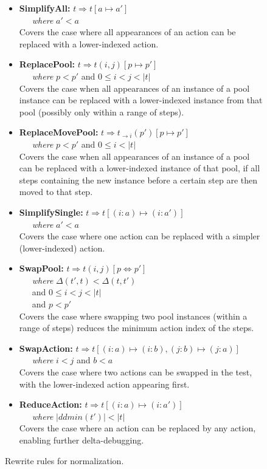 \begin{figure}[t]
{\scriptsize
\begin{itemize}
\item {\bf SimplifyAll:}
$t \Rightarrow t[a \mapsto a']$\\
\-\ \ \ \emph{where} $a' < a$\\
Covers the case where all appearances of an action can be replaced with a 
lower-indexed action. 
\item {\bf ReplacePool:}
$t \Rightarrow t(i,j)[p \mapsto p']$\\ 
\-\ \ \ \emph{where} $p < p'$ and $0 \leq i < j <
|t|$\\
Covers the case when all appearances of an instance of a pool instance
can be replaced with 
a lower-indexed instance from that pool (possibly only within a range of steps).
\item {\bf ReplaceMovePool:}
$t \Rightarrow t_{\rightarrow i}(p')[p \mapsto p']$\\
\-\ \ \ \emph{where} $p < p'$ and $0
\leq i < |t|$\\
Covers the case when all appearances of an instance of a pool can be replaced with
a lower-indexed instance of that pool, if all steps containing the new instance before a
certain step are then moved to that step.
\item {\bf SimplifySingle:}
$t \Rightarrow t[(i: a) \mapsto (i: a')]$\\
\-\ \ \ \emph{where} $a' < a$\\
Covers the case where one action can be replaced with a 
simpler (lower-indexed) action. 
\item {\bf SwapPool:}
$t \Rightarrow t(i,j)[p \Leftrightarrow p']$\\
\-\ \ \ \emph{where} $\Delta(t',t) < \Delta(t,t')$\\
\-\ \ \ and $0 \leq i < j < |t|$\\
\-\ \ \ and $p < p'$\\
Covers the case where swapping two pool instances (within a range of steps) reduces
the minimum action index of the steps.
\item {\bf SwapAction:}
$t \Rightarrow t[(i: a) \mapsto (i: b), (j: b) \mapsto (j: a)]$\\
\-\ \ \ \emph{where} $i < j$ and
$b < a$\\
Covers the case where two actions can be swapped in the test, with the
lower-indexed action appearing first.
\item {\bf ReduceAction:}
$t \Rightarrow t[(i: a) \mapsto (i: a')]$\\
\-\ \ \ \emph{where} $|ddmin(t')| < |t|$\\
Covers the case where an action can be replaced by any action, enabling further delta-debugging.
\end{itemize}
}
\caption{Rewrite rules for normalization.}
\label{fig:rewrite}
\end{figure}

